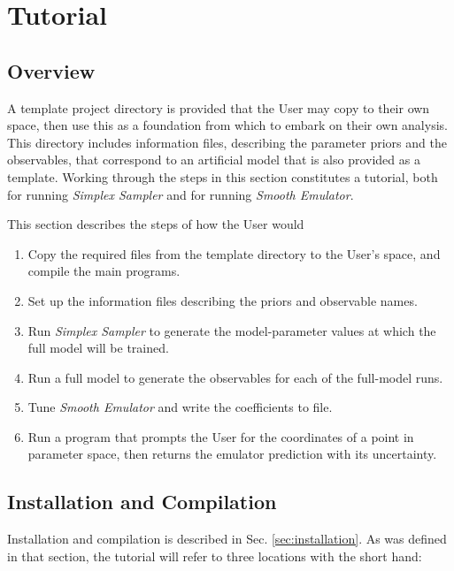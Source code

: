 \documentclass[UserManual.tex]{subfiles}
\begin{document}
\setcounter{section}{7}
\section{Tutorial}\label{sec:tutorial}

\subsection{Overview}
A template project directory is provided that the User may copy to their own space, then use this as a foundation from which to embark on their own analysis. This directory includes information files, describing the parameter priors and the observables, that correspond to an artificial model that is also provided as a template. Working through the steps in this section constitutes a tutorial, both for running {\it Simplex Sampler} and for running {\it Smooth Emulator}.

This section describes the steps of how the User would
\begin{enumerate}\itemsep=0pt
\item Copy the required files from the template directory to the User's space, and compile the main programs.
\item Set up the information files describing the priors and observable names.
\item Run {\it Simplex Sampler} to generate the model-parameter values at which the full model will be trained.
\item Run a full model to generate the observables for each of the full-model runs.
\item Tune {\it Smooth Emulator} and write the coefficients to file.
\item Run a program that prompts the User for the coordinates of a point in parameter space, then returns the emulator prediction with its uncertainty.
\end{enumerate}

\subsection{Installation and Compilation}
Installation and compilation is described in Sec. \ref{sec:installation}. As was defined in that section, the tutorial will refer to three locations with the short hand:

\vspace*{0.2in}
\end{document}
